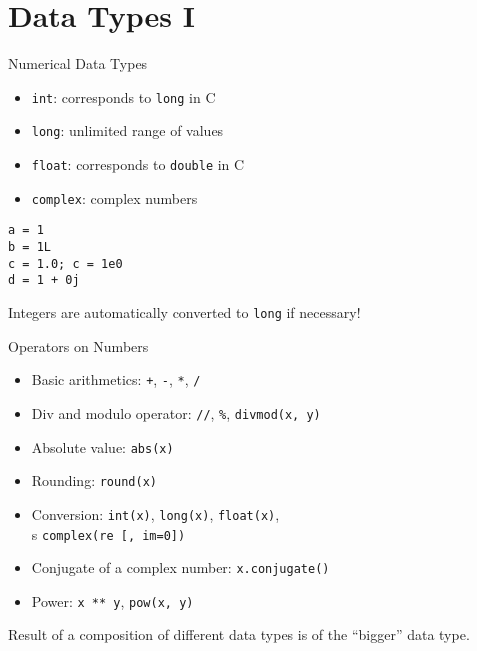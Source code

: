 \section{Data Types I}

\begin{frame}[fragile]{Numerical Data Types}
\begin{itemize}
\item \alert{\texttt{int}}: corresponds to \texttt{long} in C
\item \alert{\texttt{long}}: unlimited range of values
\item \alert{\texttt{float}}: corresponds to \texttt{double} in C 
\item \alert{\texttt{complex}}: complex numbers
\end{itemize} 
\begin{lstlisting}[style=Python]
a = 1
b = 1L
c = 1.0; c = 1e0
d = 1 + 0j
\end{lstlisting}
\vspace{3mm}
Integers are automatically converted to \texttt{long} if necessary!
\end{frame}

\begin{frame}{Operators on Numbers}
\begin{itemize}
\item \alert{Basic arithmetics}: \texttt{+}, \texttt{-}, \texttt{*}, \texttt{/}
\item Div and modulo operator: \texttt{//}, \hspace{1mm}\texttt{\%}, \hspace{1mm}\texttt{divmod(x, y)}
\item \alert{Absolute value}: \texttt{abs(x)}
\item \alert{Rounding}: \texttt{round(x)}
\item Conversion: \texttt{int(x)}, \texttt{long(x)}, \texttt{float(x)},\\s \texttt{complex(re~[, im=0])}
\item Conjugate of a complex number: \texttt{x.conjugate()}
\item \alert{Power}: \texttt{x ** y}, \hspace{1mm}\texttt{pow(x, y)}
\end{itemize}
Result of a composition of different data types is of the ``bigger'' data type.
\end{frame}

